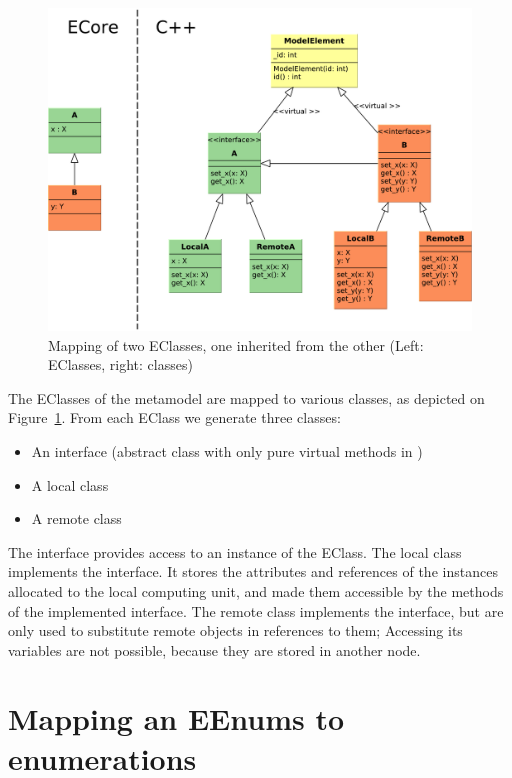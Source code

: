 \begin{figure}
	\begin{center}
		\includegraphics[width=\textwidth]{figures/eclass-to-cpp.pdf}
		\caption{Mapping of two EClasses, one inherited from the other (Left: EClasses, right: \protect\cpp{} classes) }
		\label{fig:eclass-to-cpp}
	\end{center}
\end{figure}


The EClasses of the metamodel are mapped to various \cpp{} classes, as depicted on \mbox{Figure~\ref{fig:eclass-to-cpp}}.
From each EClass we generate three \cpp{} classes:

\begin{itemize}
	\item An interface (abstract class with only pure virtual methods in \cpp{})
	\item A local class
	\item A remote class
\end{itemize}


The interface provides access to an instance of the EClass.
The local class implements the interface. It stores the attributes and references of the instances allocated to the local computing unit, and made them accessible by the methods of the implemented interface.
The remote class implements the interface, but are only used to substitute remote objects in references to them; 
Accessing its variables are not possible, because they are stored in another node. 

\section{Mapping an EEnums to \protect\cpp enumerations }

